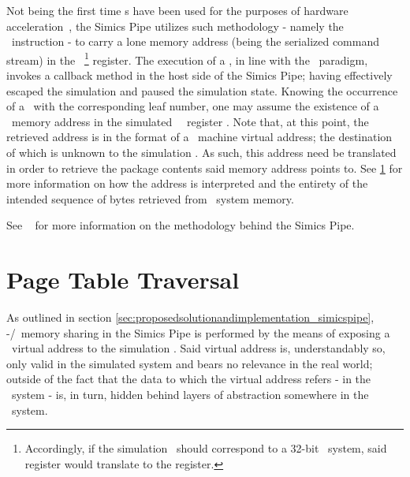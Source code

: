 Not being the first time \dvttermmagicinstruction s have been used for the purposes of hardware acceleration~, the Simics Pipe utilizes such methodology - namely the  \dvttermxeightysix\ instruction - to carry a lone memory address (being the serialized command stream) in the \dvttermtarget\ \footnote{Accordingly, if the simulation \dvttermtarget\ should correspond to a 32-bit \dvttermxeightysix\ system, said register would translate to the  register.} register.
The execution of a \dvttermmagicinstruction , in line with the \dvttermmagicinstruction\ paradigm, invokes a callback method in the host side of the Simics Pipe; having effectively escaped the simulation and paused the simulation state.
Knowing the occurrence of a \dvttermmagicinstruction\ with the corresponding leaf number, one may assume the existence of a \dvttermtarget\ memory address in the simulated \dvttermtarget\ \dvttermcpu\ register .
Note that, at this point, the retrieved address is in the format of a \dvttermtarget\ machine virtual address; the destination of which is unknown to the simulation \dvttermhost .
As such, this address need be translated in order to retrieve the package contents said memory address points to.
See \ref{sec:proposedsolutionandimplementation_pagetabletraversal} for more information on how the address is interpreted and the entirety of the intended sequence of bytes retrieved from \dvttermhost\ system memory.

See ~ for more information on the methodology behind the Simics Pipe.


\section{Page Table Traversal}
\label{sec:proposedsolutionandimplementation_pagetabletraversal}
As outlined in section \ref{sec:proposedsolutionandimplementation_simicspipe}, \dvttermtarget -/\dvttermhost\ memory sharing in the Simics Pipe is performed by the means of exposing a \dvttermtarget\ virtual address to the simulation \dvttermhost .
Said virtual address is, understandably so, only valid in the simulated system and bears no relevance in the real world; outside of the fact that the data to which the virtual address refers - in the \dvttermtarget\ system - is, in turn, hidden behind layers of abstraction somewhere in the \dvttermhost\ system.

